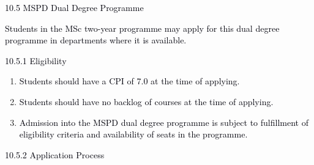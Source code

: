 \documentclass[12pt]{article}
\begin{document}
\vspace{\baselineskip}
\textcolor[HTML]{00000A}{10.5 MSPD Dual Degree Programme}\par


\vspace{\baselineskip}
{\fontsize{9pt}{10.8pt}\selectfont \textcolor[HTML]{00000A}{Students in the MSc two-year programme may apply for this dual degree programme in departments where it is available.}\par}\par


\vspace{\baselineskip}
{\fontsize{10pt}{12.0pt}\selectfont \textcolor[HTML]{00000A}{10.5.1 Eligibility}\par}\par


\vspace{\baselineskip}
\begin{enumerate}
	\item {\fontsize{10pt}{12.0pt}\selectfont \textcolor[HTML]{00000A}{Students should have a CPI of 7.0 at the time of applying.}\par}\par


\vspace{\baselineskip}
	\item {\fontsize{10pt}{12.0pt}\selectfont \textcolor[HTML]{00000A}{Students should have no backlog of courses at the time of applying.}\par}\par


\vspace{\baselineskip}
	\item {\fontsize{10pt}{12.0pt}\selectfont \textcolor[HTML]{00000A}{Admission into the MSPD dual degree programme is subject to fulfillment of eligibility criteria and availability of seats in the programme.}\par}
\end{enumerate}\par


\vspace{\baselineskip}
{\fontsize{10pt}{12.0pt}\selectfont \textcolor[HTML]{00000A}{10.5.2 Application Process}\par}\par
\end{document}
